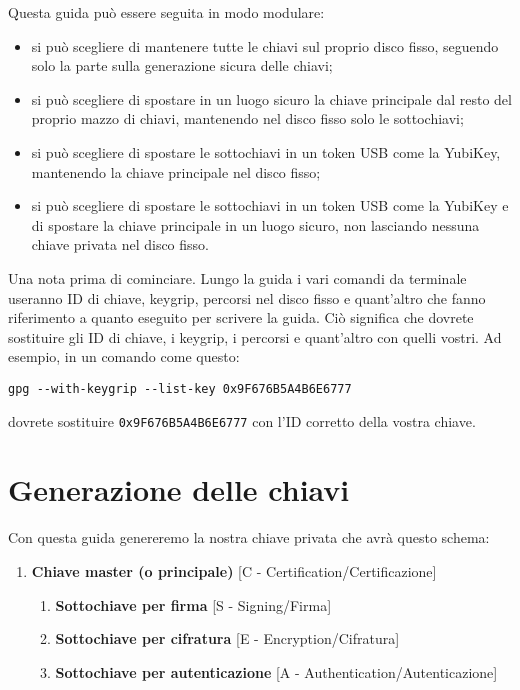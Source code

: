 \documentclass[a4paper,10pt]{article}
\begin{document}
Questa guida può essere seguita in modo modulare:

\begin{itemize}
 \item si può scegliere di mantenere tutte le chiavi sul proprio disco fisso, seguendo solo la parte sulla generazione sicura delle chiavi;
 \item si può scegliere di spostare in un luogo sicuro la chiave principale dal resto del proprio mazzo di chiavi, mantenendo nel disco fisso solo le sottochiavi;
 \item si può scegliere di spostare le sottochiavi in un token USB come la YubiKey, mantenendo la chiave principale nel disco fisso;
 \item si può scegliere di spostare le sottochiavi in un token USB come la YubiKey e di spostare la chiave principale in un luogo sicuro, non lasciando nessuna chiave privata nel disco fisso.
\end{itemize}

Una nota prima di cominciare. Lungo la guida i vari comandi da terminale useranno ID di chiave, keygrip, percorsi nel disco fisso e quant'altro che fanno riferimento a quanto eseguito per scrivere la guida. Ciò significa che dovrete sostituire gli ID di chiave, i keygrip, i percorsi e quant'altro con quelli vostri. Ad esempio, in un comando come questo:

\begin{verbatim}
gpg --with-keygrip --list-key 0x9F676B5A4B6E6777
\end{verbatim}

dovrete sostituire \texttt{0x9F676B5A4B6E6777} con l'ID corretto della vostra chiave.

\section{Generazione delle chiavi}

Con questa guida genereremo la nostra chiave privata che avrà questo schema:

\begin{enumerate}
 \item \textbf{Chiave master (o principale)} [C - Certification/Certificazione]
 \begin{enumerate}
  \item \textbf{Sottochiave per firma} [S - Signing/Firma]
  \item \textbf{Sottochiave per cifratura} [E - Encryption/Cifratura]
  \item \textbf{Sottochiave per autenticazione} [A - Authentication/Autenticazione]
 \end{enumerate}
\end{enumerate}
\end{document}
